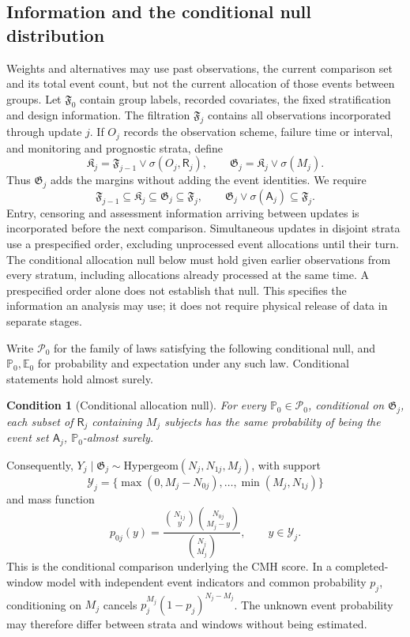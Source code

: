 \documentclass[12pt]{article}
\newtheorem{condition}[theorem]{Condition}
\theoremstyle{definition}
\theoremstyle{remark}
\begin{document}
\subsection{Information and the conditional null distribution}
\label{sec:information-flow}

Weights and alternatives may use past observations, the current comparison set and its total event count, but not the current allocation of those events between groups. Let $\mathfrak F_0$ contain group labels, recorded covariates, the fixed stratification and design information. The filtration $\mathfrak F_j$ contains all observations incorporated through update $j$. If $O_j$ records the observation scheme, failure time or interval, and monitoring and prognostic strata, define
\begin{equation}
 \mathfrak K_j=\mathfrak F_{j-1}\vee\sigma(O_j,\mathsf R_j),
 \qquad
 \mathfrak G_j=\mathfrak K_j\vee\sigma(M_j).
 \label{eq:intermediate-sigma-algebra}
\end{equation}
Thus $\mathfrak G_j$ adds the margins without adding the event identities. We require
\[
 \mathfrak F_{j-1}\subseteq\mathfrak K_j\subseteq\mathfrak G_j\subseteq\mathfrak F_j,
 \qquad \mathfrak G_j\vee\sigma(\mathsf A_j)\subseteq\mathfrak F_j.
\]
Entry, censoring and assessment information arriving between updates is incorporated before the next comparison. Simultaneous updates in disjoint strata use a prespecified order, excluding unprocessed event allocations until their turn. The conditional allocation null below must hold given earlier observations from every stratum, including allocations already processed at the same time. A prespecified order alone does not establish that null. This specifies the information an analysis may use; it does not require physical release of data in separate stages.

Write $\mathcal P_0$ for the family of laws satisfying the following conditional null, and $\mathbb P_0,\mathbb E_0$ for probability and expectation under any such law. Conditional statements hold almost surely.
\begin{condition}[Conditional allocation null]
\label{ass:allocation}
For every $\mathbb P_0\in\mathcal P_0$, conditional on $\mathfrak G_j$, each subset of $\mathsf R_j$ containing $M_j$ subjects has the same probability of being the event set $\mathsf A_j$, $\mathbb P_0$-almost surely.
\end{condition}
Consequently, $Y_j\mid\mathfrak G_j\sim\mathrm{Hypergeom}(N_j,N_{1j},M_j)$, with support
\[
 \mathcal Y_j=\{\max(0,M_j-N_{0j}),\ldots,\min(M_j,N_{1j})\}
\]
and mass function
\begin{equation}
 p_{0j}(y)=\frac{\binom{N_{1j}}{y}\binom{N_{0j}}{M_j-y}}{\binom{N_j}{M_j}},
 \qquad y\in\mathcal Y_j.
 \label{eq:null-pmf}
\end{equation}
This is the conditional comparison underlying the CMH score. In a completed-window model with independent event indicators and common probability $p_j$, conditioning on $M_j$ cancels $p_j^{M_j}(1-p_j)^{N_j-M_j}$. The unknown event probability may therefore differ between strata and windows without being estimated.
\end{document}
